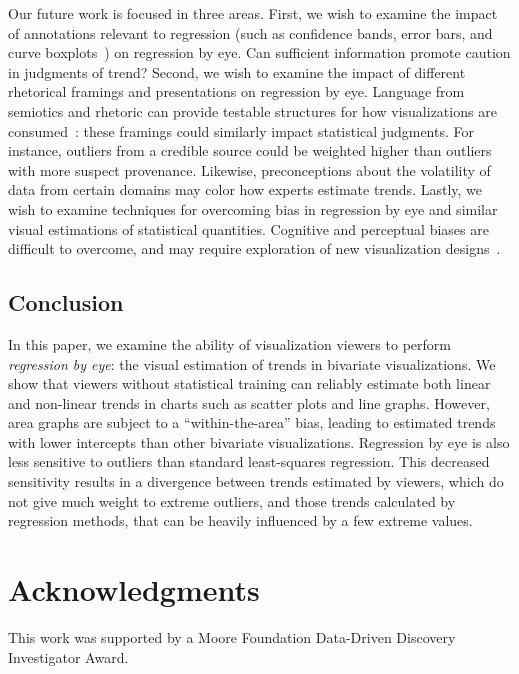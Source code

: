 \documentclass{sigchi}
\begin{document}
Our future work is focused in three areas. First, we wish to examine the impact of annotations relevant to regression (such as confidence bands, error bars, and curve boxplots~\cite{mirzargar2014curve}) on regression by eye. Can sufficient information promote caution in judgments of trend? Second, we wish to examine the impact of different rhetorical framings and presentations on regression by eye. Language from semiotics and rhetoric can provide testable structures for how visualizations are consumed~\cite{hullman2011visualization}: these framings could similarly impact statistical judgments. For instance, outliers from a credible source could be weighted higher than outliers with more suspect provenance. Likewise, preconceptions about the volatility of data from certain domains may color how experts estimate trends. Lastly, we wish to examine techniques for overcoming bias in regression by eye and similar visual estimations of statistical quantities. Cognitive and perceptual biases are difficult to overcome, and may require exploration of new visualization designs~\cite{micallef2012assessing}.

\subsection{Conclusion}

In this paper, we examine the ability of visualization viewers to perform \emph{regression by eye}: the visual estimation of trends in bivariate visualizations. We show that viewers without statistical training can reliably estimate both linear and non-linear trends in charts such as scatter plots and line graphs. However, area graphs are subject to a ``within-the-area'' bias, leading to estimated trends with lower intercepts than other bivariate visualizations. Regression by eye is also less sensitive to outliers than standard least-squares regression. This decreased sensitivity results in a divergence between trends estimated by viewers, which do not give much weight to extreme outliers, and those trends calculated by regression methods, that can be heavily influenced by a few extreme values. 


\section{Acknowledgments}

This work was supported by a Moore Foundation Data-Driven Discovery Investigator Award. 
\end{document}
